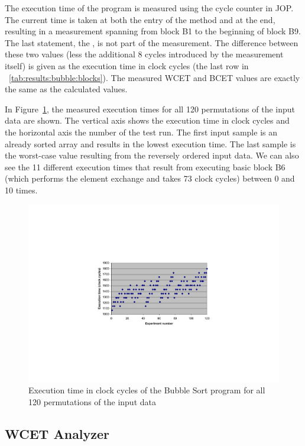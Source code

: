 The execution time of the program is measured using the cycle
counter in JOP. The current time is taken at both the entry of the
method and at the end, resulting in a measurement spanning from
block B1 to the beginning of block B9. The last statement, the
, is not part of the measurement. The difference
between these two values (less the additional 8 cycles introduced by
the measurement itself) is given as the execution time in clock
cycles (the last row in \tablename~\ref{tab:results:bubble:blocks}).
The measured WCET and BCET values are exactly the same as the
calculated values.


In Figure~\ref{fig:results:wcet:sort}, the measured execution times
for all 120 permutations of the input data are shown. The vertical
axis shows the execution time in clock cycles and the horizontal
axis the number of the test run. The first input sample is an
already sorted array and results in the lowest execution time. The
last sample is the worst-case value resulting from the reversely
ordered input data. We can also see the 11 different execution times
that result from executing basic block B6 (which performs the
element exchange and takes 73 clock cycles) between 0 and 10 times.

\begin{figure}
    \centering
    \includegraphics[width=\excelwidth]{results/results_wcet_sort}
    \caption{Execution time in clock cycles of the Bubble Sort program
    for all 120 permutations of the input data}
    \label{fig:results:wcet:sort}
\end{figure}




\subsection{WCET Analyzer} \label{sec:wcet:java}

